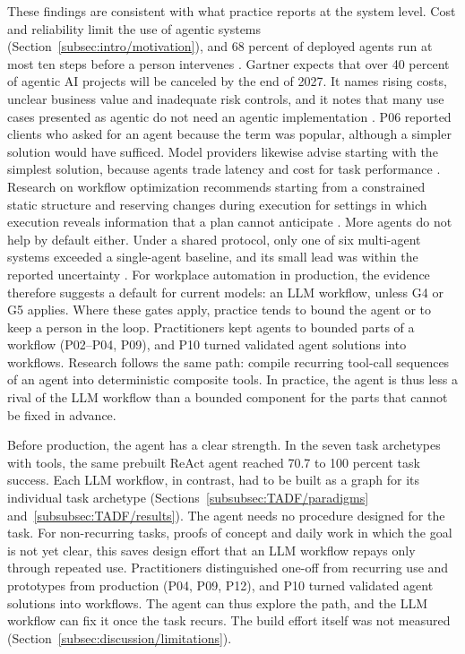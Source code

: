 These findings are consistent with what practice reports at the system level. Cost and reliability limit the use of agentic systems (Section~\ref{subsec:intro/motivation}), and 68 percent of deployed agents run at most ten steps before a person intervenes \parencite{panMeasuringAgentsProduction2025}. Gartner expects that over 40 percent of agentic AI projects will be canceled by the end of 2027. It names rising costs, unclear business value and inadequate risk controls, and it notes that many use cases presented as agentic do not need an agentic implementation \parencite{gartnerGartnerPredictsOver2025}. P06 reported clients who asked for an agent because the term was popular, although a simpler solution would have sufficed. Model providers likewise advise starting with the simplest solution, because agents trade latency and cost for task performance \parencite{schluntzBuildingEffectiveAI2024,openaiPracticalGuideAgents2026}. Research on workflow optimization recommends starting from a constrained static structure and reserving changes during execution for settings in which execution reveals information that a plan cannot anticipate \parencite{yueStaticTemplatesDynamic2026}. More agents do not help by default either. Under a shared protocol, only one of six multi-agent systems exceeded a single-agent baseline, and its small lead was within the reported uncertainty \parencite{fuDoMoreAgentsHelp2026}. For workplace automation in production, the evidence therefore suggests a default for current models: an LLM workflow, unless G4 or G5 applies. Where these gates apply, practice tends to bound the agent or to keep a person in the loop. Practitioners kept agents to bounded parts of a workflow (P02--P04, P09), and P10 turned validated agent solutions into workflows. Research follows the same path: \textcite{abuzakukOptimizingAgenticWorkflows2026} compile recurring tool-call sequences of an agent into deterministic composite tools. In practice, the agent is thus less a rival of the LLM workflow than a bounded component for the parts that cannot be fixed in advance.

Before production, the agent has a clear strength. In the seven task archetypes with tools, the same prebuilt ReAct agent reached 70.7 to 100 percent task success. Each LLM workflow, in contrast, had to be built as a graph for its individual task archetype (Sections~\ref{subsubsec:TADF/paradigms} and~\ref{subsubsec:TADF/results}). The agent needs no procedure designed for the task. For non-recurring tasks, proofs of concept and daily work in which the goal is not yet clear, this saves design effort that an LLM workflow repays only through repeated use. Practitioners distinguished one-off from recurring use and prototypes from production (P04, P09, P12), and P10 turned validated agent solutions into workflows. The agent can thus explore the path, and the LLM workflow can fix it once the task recurs. The build effort itself was not measured (Section~\ref{subsec:discussion/limitations}).

